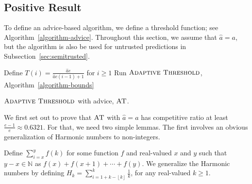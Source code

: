 \documentclass[a4paper,UKenglish,cleveref, autoref, thm-restate]{lipics-v2021}
\newcommand{\bALG}{\ensuremath{\operatorname{\textsc{Adaptive Threshold}}}\xspace}
\newcommand{\ADB}{\ensuremath{\operatorname{\textsc{AT}}}\xspace}
\newcommand{\FLOOR}[1]{\left\lfloor#1\right\rfloor}
\newcommand{\NAT}{\ensuremath{\mathbb{N}}}
\newcommand{\TF}{T}
\newcommand{\guess}{\ensuremath{\hat{a}}\xspace}
\begin{document}
\subsection{Positive Result}

To define an advice-based algorithm, we define a threshold function;
see Algorithm~\ref{algorithm-advice}.
Throughout this section, we assume that $\guess=a$, but the algorithm
is also be used for untrusted predictions in Subsection~\ref{sec:semitrusted}.

\begin{algorithm}
\begin{algorithmic}[1]
\State Define $\displaystyle \TF(i)=\frac{\guess e}{\guess e(i-1)+1}$ for $i \geq 1$
\State Run \bALG, Algorithm~\ref{algorithm-bounds}
\end{algorithmic}
\caption{\bALG with advice, \ADB.}
\label{algorithm-advice}
\end{algorithm}

We first set out to prove that \ADB with $\guess = a$ has
competitive ratio at least $\frac{e-1}{e}\approx 0.6321$.
For that, we need two simple lemmas. The first involves an
obvious generalization of Harmonic numbers to non-integers.

Define $\sum_{i=x}^{y}f(k)$ for some function $f$ and real-valued $x$
and $y$ such that $y-x\in\NAT$ as $f(x)+f(x+1)+\cdots + f(y)$.  We
generalize the Harmonic numbers by defining
$H_k=\sum_{i=1+k-\FLOOR{k}}^{k}\frac{1}{k}$, for any real-valued
$k \geq 1$.
\end{document}
